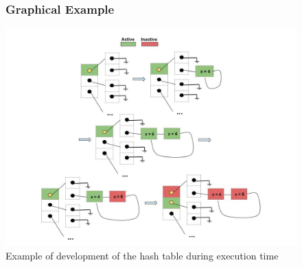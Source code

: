 \documentclass[12pt]{article}
\begin{document}
\newpage
\begin{figure}
\subsubsection{Graphical Example}
		\vspace{1cm}
		\hspace{-2.2cm}
		\includegraphics[scale=0.6]{./img/Graphic_ex.jpg}
		\caption{Example of development of the hash table during execution time}
		\vspace{4cm}
\end{figure}
\newpage
\end{document}
